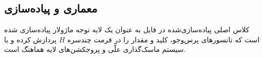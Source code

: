 \subsection{معماری و پیاده‌سازی}
کلاس اصلی پیاده‌سازی‌شده در فایل  به عنوان یک لایه توجه ماژولار پیاده‌سازی شده است که تانسورهای پرس‌وجو، کلید و مقدار را در فرمت چندسره $H$ پردازش کرده و با سیستم ماسک‌گذاری علّی و پروجکشن‌های لایه هماهنگ است.
